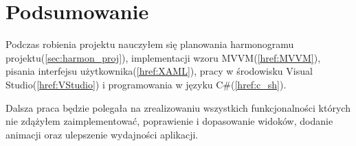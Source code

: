 ﻿%
\chapter{Podsumowanie}

Podczas robienia projektu nauczyłem się planowania harmonogramu projektu(\ref{sec:harmon_proj}), implementacji wzoru MVVM(\ref{href:MVVM}), pisania interfejsu użytkownika(\ref{href:XAML}), pracy w środowisku Visual Studio(\ref{href:VStudio}) i programowania w języku C\#(\ref{href:c_sh}).

Dalsza praca będzie polegała na zrealizowaniu wszystkich funkcjonalności których nie zdążyłem zaimplementować, poprawienie i dopasowanie widoków, dodanie animacji oraz ulepszenie wydajności aplikacji.




